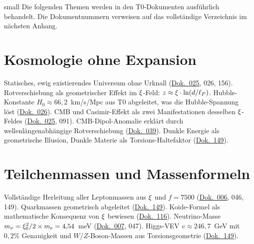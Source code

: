 small
Die folgenden Themen werden in den T0-Dokumenten ausführlich behandelt. Die Dokumentnummern verweisen auf das vollständige Verzeichnis im nächsten Anhang.

\section{Kosmologie ohne Expansion}
Statisches, ewig existierendes Universum ohne Urknall (\href{https://github.com/jpascher/T0-Time-Mass-Duality/blob/main/2/pdf/025_T0_Kosmologie_De.pdf}{Dok.~025}, 026, 156). Rotverschiebung als geometrischer Effekt im $\xi$-Feld: $z \approx \xi \cdot \ln(d/\ell_P)$. Hubble-Konstante $H_0 \approx 66{,}2$~km/s/Mpc aus T0 abgeleitet, was die Hubble-Spannung löst (\href{https://github.com/jpascher/T0-Time-Mass-Duality/blob/main/2/pdf/026_T0_Geometrische_Kosmologie_De.pdf}{Dok.~026}). CMB und Casimir-Effekt als zwei Manifestationen desselben $\xi$-Feldes (\href{https://github.com/jpascher/T0-Time-Mass-Duality/blob/main/2/pdf/025_T0_Kosmologie_De.pdf}{Dok.~025}, 091). CMB-Dipol-Anomalie erklärt durch wellenlängenabhängige Rotverschiebung (\href{https://github.com/jpascher/T0-Time-Mass-Duality/blob/main/2/pdf/039_Zwei-Dipole-CMB_De.pdf}{Dok.~039}). Dunkle Energie als geometrische Illusion, Dunkle Materie als Torsions-Haltefaktor (\href{https://github.com/jpascher/T0-Time-Mass-Duality/blob/main/2/pdf/149_FFGFT-torsion_De.pdf}{Dok.~149}).

\section{Teilchenmassen und Massenformeln}
Vollständige Herleitung aller Leptonmassen aus $\xi$ und $f = 7500$ (\href{https://github.com/jpascher/T0-Time-Mass-Duality/blob/main/2/pdf/006_T0_Teilchenmassen_De.pdf}{Dok.~006}, 046, 149). Quarkmassen geometrisch abgeleitet (\href{https://github.com/jpascher/T0-Time-Mass-Duality/blob/main/2/pdf/149_FFGFT-torsion_De.pdf}{Dok.~149}). Koide-Formel als mathematische Konsequenz von $\xi$ bewiesen (\href{https://github.com/jpascher/T0-Time-Mass-Duality/blob/main/2/pdf/116_T0_koide-formel-3_De.pdf}{Dok.~116}). Neutrino-Masse $m_\nu = \xi_0^2/2 \times m_e = 4{,}54$~meV (\href{https://github.com/jpascher/T0-Time-Mass-Duality/blob/main/2/pdf/007_T0_Neutrinos_De.pdf}{Dok.~007}, 047). Higgs-VEV $v \approx 246{,}7$~GeV mit $0{,}2\%$ Genauigkeit und $W$/$Z$-Boson-Massen aus Torsionsgeometrie (\href{https://github.com/jpascher/T0-Time-Mass-Duality/blob/main/2/pdf/149_FFGFT-torsion_De.pdf}{Dok.~149}).

